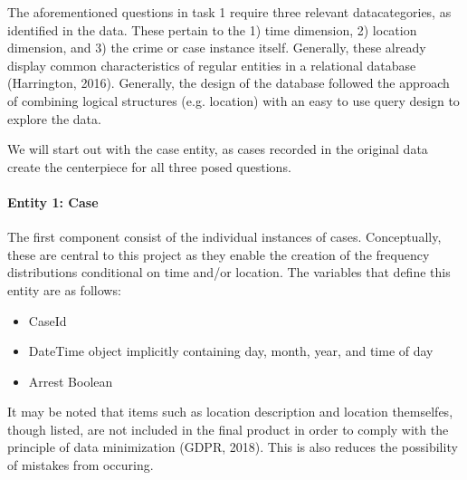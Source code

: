 \documentclass[a4paper]{article}
\begin{document}
The aforementioned questions in task 1 require three relevant datacategories, as identified in the data. These pertain to the 1) time dimension, 2) location dimension, and 3) the crime or case instance itself. Generally, these already display common characteristics of regular entities in a relational database (Harrington, 2016). Generally, the design of the database followed the approach of combining logical structures (e.g. location) with an easy to use query design to explore the data.

We will start out with the case entity, as cases recorded in the original data create the centerpiece for all three posed questions.



\paragraph{Entity 1: Case} The first component consist of the individual instances of cases. Conceptually, these are central to this project as they enable the creation of the frequency distributions conditional on time and/or location. The variables that define this entity are as follows:

\begin{itemize}
  \item CaseId
  \item DateTime object implicitly containing day, month, year, and time of day 
  \item Arrest Boolean  
\end{itemize}
 
It may be noted that items such as location description and location themselfes, though listed, are not included in the final product in order to comply with the principle of data minimization (GDPR, 2018). This is also reduces the possibility of mistakes from occuring. 
\end{document}
